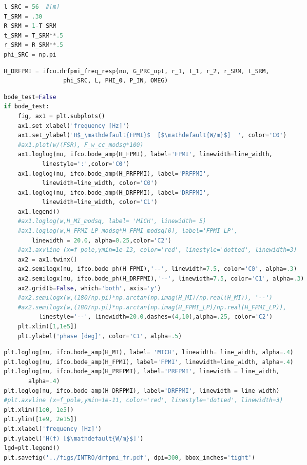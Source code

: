 \begin{spacing}{1}\begin{lstlisting}[frame=single, language=Python]
l_SRC = 56  #[m]
T_SRM = .30
R_SRM = 1-T_SRM
t_SRM = T_SRM**.5
r_SRM = R_SRM**.5
phi_SRC = np.pi
\end{lstlisting}\end{spacing}

\begin{spacing}{1}\begin{lstlisting}[frame=single, language=Python]
H_DRFPMI = ifco.drfpmi_freq_resp(nu, G_PRC_opt, r_1, t_1, r_2, r_SRM, t_SRM, 
				 phi_SRC, L, PHI_0, P_IN, OMEG)
\end{lstlisting}\end{spacing}

\begin{spacing}{1}\begin{lstlisting}[frame=single, language=Python]
bode_test=False
if bode_test:
    fig, ax1 = plt.subplots()
    ax1.set_xlabel('frequency [Hz]')
    ax1.set_ylabel('H$_\mathdefault{FPMI}$  [$\mathdefault{W/m}$]  ', color='C0')
    #ax1.plot(w/(FSR), F_w_cc_modsq*100)
    ax1.loglog(nu, ifco.bode_amp(H_FPMI), label='FPMI', linewidth=line_width, 
	       linestyle=':',color='C0')
    ax1.loglog(nu, ifco.bode_amp(H_PRFPMI), label='PRFPMI',  
	       linewidth=line_width, color='C0')
    ax1.loglog(nu, ifco.bode_amp(H_DRFPMI), label='DRFPMI',  
	       linewidth=line_width, color='C1')
    ax1.legend()
    #ax1.loglog(w,H_MI_modsq, label= 'MICH', linewidth= 5)
    #ax1.loglog(w,H_FPMI_LP_modsq*H_FPMI_modsq[0], label='FPMI LP', 
		linewidth = 20.0, alpha=0.25,color='C2')
    #ax1.axvline (x=f_pole,ymin=1e-13, color='red', linestyle='dotted', linewidth=3)
    ax2 = ax1.twinx()
    ax2.semilogx(nu, ifco.bode_ph(H_FPMI),'--', linewidth=7.5, color='C0', alpha=.3)
    ax2.semilogx(nu, ifco.bode_ph(H_DRFPMI),'--', linewidth=7.5, color='C1', alpha=.3)
    ax2.grid(b=False, which='both', axis='y')
    #ax2.semilogx(w,(180/np.pi)*np.arctan(np.imag(H_MI)/np.real(H_MI)), '--')
    #ax2.semilogx(w,(180/np.pi)*np.arctan(np.imag(H_FPMI_LP)/np.real(H_FPMI_LP)),
		  linestyle='--', linewidth=20.0,dashes=(4,10),alpha=.25, color='C2')
    plt.xlim([1,1e5])
    plt.ylabel('phase [deg]', color='C1', alpha=.5)
\end{lstlisting}\end{spacing}

\begin{spacing}{1}\begin{lstlisting}[frame=single, language=Python]
plt.loglog(nu, ifco.bode_amp(H_MI), label= 'MICH', linewidth= line_width, alpha=.4)
plt.loglog(nu, ifco.bode_amp(H_FPMI), label='FPMI', linewidth=line_width, alpha=.4)
plt.loglog(nu, ifco.bode_amp(H_PRFPMI), label='PRFPMI', linewidth = line_width, 
	   alpha=.4)
plt.loglog(nu, ifco.bode_amp(H_DRFPMI), label='DRFPMI', linewidth = line_width)
#plt.axvline (x=f_pole,ymin=1e-11, color='red', linestyle='dotted', linewidth=3)
plt.xlim([1e0, 1e5])
plt.ylim([1e9, 2e15])
plt.xlabel('frequency [Hz]')
plt.ylabel('H(f) [$\mathdefault{W/m}$]')
lgd=plt.legend()
plt.savefig('../figs/INTRO/drfpmi_fr.pdf', dpi=300, bbox_inches='tight')
\end{lstlisting}\end{spacing}

